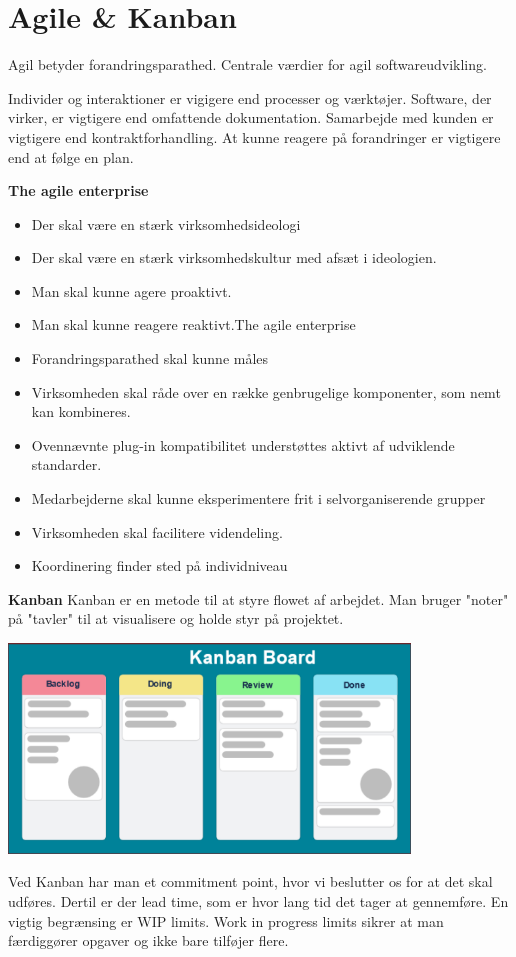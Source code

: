 \section{Agile \& Kanban}

Agil betyder forandringsparathed.
Centrale værdier for agil softwareudvikling.

Individer og interaktioner er vigigere end processer og værktøjer. Software, der virker, er vigtigere end omfattende dokumentation.
Samarbejde med kunden er vigtigere end kontraktforhandling. At kunne reagere på forandringer er vigtigere end at følge en plan.


\textbf{The agile enterprise}
\begin{itemize}
	\item{Der skal være en stærk virksomhedsideologi}
	\item{Der skal være en stærk virksomhedskultur med afsæt i ideologien.}
	\item{Man skal kunne agere proaktivt.}
	\item{Man skal kunne reagere reaktivt.The agile enterprise}
	\item{Forandringsparathed skal kunne måles}
	\item{Virksomheden skal råde over en række genbrugelige komponenter, som nemt kan kombineres.}
	\item{Ovennævnte plug-in kompatibilitet understøttes aktivt af udviklende standarder.}
	\item{Medarbejderne skal kunne eksperimentere frit i selvorganiserende grupper}
	\item{Virksomheden skal facilitere videndeling.}
	\item {Koordinering finder sted på individniveau}
\end{itemize}

\textbf{Kanban}
Kanban er en metode til at styre flowet af arbejdet. Man bruger "noter" på "tavler" til at visualisere og holde styr på projektet.

\begin{center}
	\includegraphics[width=0.8\textwidth]{Images/Kanban.png}
\end{center}

Ved Kanban har man et commitment point, hvor vi beslutter os for at det skal udføres.
Dertil er der lead time, som er hvor lang tid det tager at gennemføre. En vigtig begrænsing er  WIP limits.
Work in progress limits sikrer at man færdiggører opgaver og ikke bare tilføjer flere.

